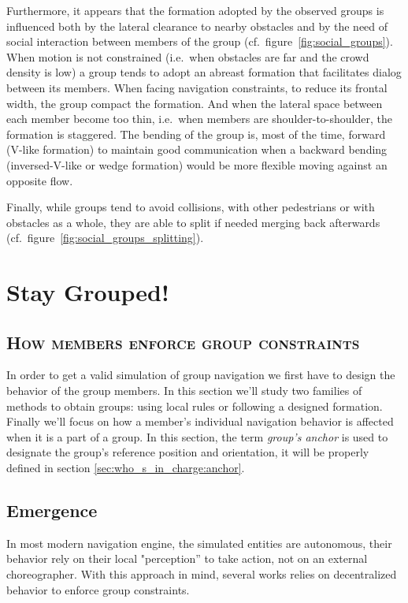 \documentclass[a4paper,titlepage]{article}
\newcommand{\sectionsubtitle}[1]{{\subsection*{\scshape #1}}}
\begin{document}
Furthermore, it appears that the formation adopted by the observed groups is influenced both by the lateral clearance to nearby obstacles and by the need of social interaction between members of the group (cf.\ figure~\ref{fig:social_groups}). When motion is not constrained (i.e.\ when obstacles are far and the crowd density is low) a group tends to adopt an abreast formation that facilitates dialog between its members. When facing navigation constraints, to reduce its frontal width, the group compact the formation. And when the lateral space between each member become too thin, i.e.\ when members are shoulder-to-shoulder, the formation is staggered. The bending of the group is, most of the time, forward (V-like formation) to maintain good communication when a backward bending (inversed-V-like or wedge formation) would be more flexible moving against an opposite flow.

Finally, while groups tend to avoid collisions, with other pedestrians or with obstacles as a whole, they are able to split if needed merging back afterwards (cf.\ figure~\ref{fig:social_groups_splitting}).

\section{Stay Grouped!}
\label{sec:stay_grouped}
\sectionsubtitle{How members enforce group constraints}

In order to get a valid simulation of group navigation we first have to design the behavior of the group members. In this section we’ll study two families of methods to obtain groups: using local rules or following a designed formation. Finally we’ll focus on how a member’s individual navigation behavior is affected when it is a part of a group. In this section, the term \emph{group's anchor} is used to designate the group's reference position and orientation, it will be properly defined in section \ref{sec:who_s_in_charge:anchor}.

\subsection{Emergence}
\label{sec:stay_grouped:emergence}

In most modern navigation engine, the simulated entities are autonomous, their behavior rely on their local "perception” to take action, not on an external choreographer. With this approach in mind, several works relies on decentralized behavior to enforce group constraints.
\end{document}
